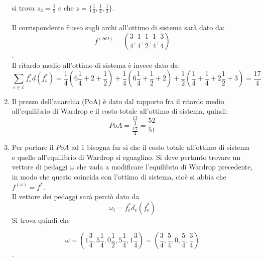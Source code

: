 \documentclass[13pt,largemargins]{homework}
\begin{document}
\begin{enumerate}[label=(\alph*)]
si trova $z_3 = \frac{1}{2}$ e che $z=\{\frac{1}{4}, \frac{1}{4}, \frac{1}{2}\}$.\\\\
Il corrispondente flusso sugli archi all'ottimo di sistema sarà dato da: \[f^{(SO)}=(\frac{3}{4},\frac{1}{4},\frac{1}{2}, \frac{1}{4}, \frac{3}{4})\].\\
Il ritardo medio all'ottimo di sistema è invece dato da: \[\sum_{e\in \mathcal{E}}f_e^* d(f_e^*)=\frac{1}{4}(6\frac{1}{4}+2+\frac{1}{2})+\frac{1}{4}(6\frac{1}{4}+\frac{1}{2}+2)+ \frac{1}{2}(\frac{1}{4}+\frac{1}{4}+2\frac{1}{2}+3)=\frac{17}{4}\]

\item Il prezzo dell'anarchia (PoA) è dato dal rapporto fra il ritardo medio all'equilibrio di Wardrop e il costo totale all'ottimo di sistema, quindi:
\[PoA=\frac{\frac{13}{3}}{\frac{17}{4}}=\frac{52}{51}\]

\item Per portare il \(PoA\) ad 1 bisogna far sì che il costo totale all'ottimo di sistema e quello all'equilibrio di Wardrop si eguaglino. Si deve pertanto trovare un vettore di pedaggi \(\omega \) che vada a modificare l'equilibrio di Wardrop precedente, in modo che questo coincida con l'ottimo di sistema, cioè si abbia che \(f^{(\omega)} = f^* \).\\ Il vettore dei pedaggi sarà perciò dato da \[ \omega_i =f_e^* d_e (f_e^*)\]
Si trova quindi che 
\begin{center}
\[\omega = (1\frac{3}{4}, 5\frac{1}{4}, 0\frac{1}{2}, 5\frac{1}{4}, 1\frac{3}{4}) = (\frac{3}{4},\frac{5}{4},0,\frac{5}{4},\frac{3}{4})\].  
\end{center}

\end{enumerate}

\newpage
\end{document}
